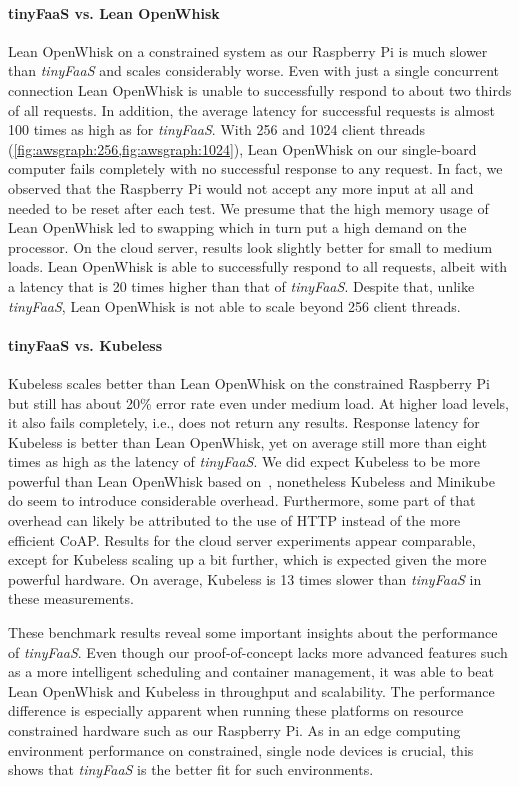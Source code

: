 \paragraph*{tinyFaaS vs. Lean OpenWhisk}
Lean OpenWhisk on a constrained system as our Raspberry Pi is much slower than \textit{tinyFaaS} and scales considerably worse.
Even with just a single concurrent connection Lean OpenWhisk is unable to successfully respond to about two thirds of all requests.
In addition, the average latency for successful requests is almost 100 times as high as for \textit{tinyFaaS}.
With 256 and 1024 client threads (\cref{fig:awsgraph:256,fig:awsgraph:1024}), Lean OpenWhisk on our single-board computer fails completely with no successful response to any request.
In fact, we observed that the Raspberry Pi would not accept any more input at all and needed to be reset after each test.
We presume that the high memory usage of Lean OpenWhisk led to swapping which in turn put a high demand on the processor.
On the cloud server, results look slightly better for small to medium loads.
Lean OpenWhisk is able to successfully respond to all requests, albeit with a latency that is 20 times higher than that of \textit{tinyFaaS}.
Despite that, unlike \textit{tinyFaaS}, Lean OpenWhisk is not able to scale beyond 256 client threads.

\paragraph*{tinyFaaS vs. Kubeless}
Kubeless scales better than Lean OpenWhisk on the constrained Raspberry Pi but still has about 20\% error rate even under medium load.
At higher load levels, it also fails completely, i.e., does not return any results.
Response latency for Kubeless is better than Lean OpenWhisk, yet on average still more than eight times as high as the latency of \textit{tinyFaaS}.
We did expect Kubeless to be more powerful than Lean OpenWhisk based on~\cite{Palade2019-mo}, nonetheless Kubeless and Minikube do seem to introduce considerable overhead.
Furthermore, some part of that overhead can likely be attributed to the use of HTTP instead of the more efficient CoAP.
Results for the cloud server experiments appear comparable, except for Kubeless scaling up a bit further, which is expected given the more powerful hardware.
On average, Kubeless is 13 times slower than \textit{tinyFaaS} in these measurements.

These benchmark results reveal some important insights about the performance of \textit{tinyFaaS}.
Even though our proof-of-concept lacks more advanced features such as a more intelligent scheduling and container management, it was able to beat Lean OpenWhisk and Kubeless in throughput and scalability.
The performance difference is especially apparent when running these platforms on resource constrained hardware such as our Raspberry Pi.
As in an edge computing environment performance on constrained, single node devices is crucial, this shows that \textit{tinyFaaS} is the better fit for such environments.
